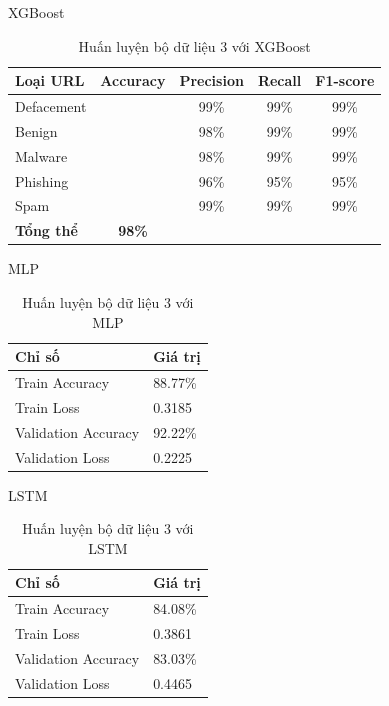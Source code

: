 \documentclass[13pt]{article}
\begin{document}
XGBoost
\begin{table}[h]
    \centering
    \renewcommand{\arraystretch}{1.3} %
    \begin{tabular}{|l|c|c|c|c|}
        \hline
        \rowcolor[HTML]{C0C0C0} %
        \textbf{Loại URL} & \textbf{Accuracy} & \textbf{Precision} & \textbf{Recall} & \textbf{F1-score} \\ 
        \hline
        Defacement &  & 99\% & 99\% & 99\% \\ 
        \hline
        Benign &  & 98\% & 99\% & 99\% \\ 
        \hline
        Malware &  & 98\% & 99\% & 99\% \\ 
        \hline
        Phishing &  & 96\% & 95\% & 95\% \\ 
        \hline
        Spam &  & 99\% & 99\% & 99\% \\ 
        \hline
        \textbf{Tổng thể} & \textbf{98\%} &  &  &  \\ 
        \hline
    \end{tabular}
    \caption{Huấn luyện bộ dữ liệu 3 với XGBoost}
    \label{tab:logistic_regression}
\end{table}

MLP
\newpage
\begin{table}[h]
    \centering
    \renewcommand{\arraystretch}{1.4} %
    \begin{tabular}{|p{5cm}|p{3cm}|}
        \hline
        \rowcolor[HTML]{C0C0C0} %
        \textbf{Chỉ số} & \textbf{Giá trị} \\ 
        \hline
        Train Accuracy & 88.77\% \\ 
        \hline
        Train Loss & 0.3185 \\ 
        \hline
        Validation Accuracy & 92.22\% \\ 
        \hline
        Validation Loss & 0.2225 \\ 
        \hline
    \end{tabular}
    \caption{Huấn luyện bộ dữ liệu 3 với MLP}
    \label{tab:mlp_training}
\end{table}

LSTM
\begin{table}[h]
    \centering
    \renewcommand{\arraystretch}{1.4} %
    \begin{tabular}{|p{5cm}|p{3cm}|}
        \hline
        \rowcolor[HTML]{C0C0C0} %
        \textbf{Chỉ số} & \textbf{Giá trị} \\ 
        \hline
        Train Accuracy & 84.08\% \\ 
        \hline
        Train Loss & 0.3861 \\ 
        \hline
        Validation Accuracy & 83.03\% \\ 
        \hline
        Validation Loss & 0.4465 \\ 
        \hline
    \end{tabular}
    \caption{Huấn luyện bộ dữ liệu 3 với LSTM}
    \label{tab:mlp_training}
\end{table}
\end{document}
